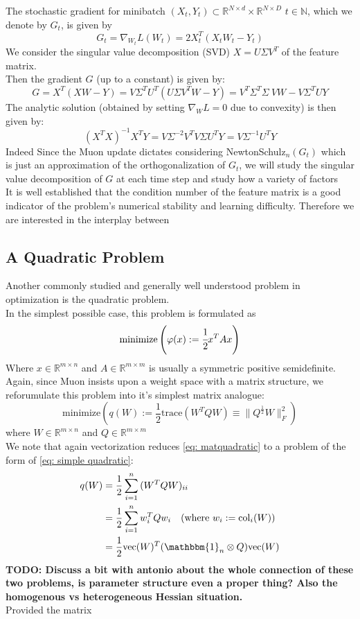 \documentclass[12pt]{book}
\newcommand{\N}{\mathbb{N}}
\newcommand{\R}{\mathbb{R}}
\newcommand{\todo}[1]{{\color{red}\bf{TODO: #1}}}
\begin{document}
The stochastic gradient for minibatch $(X_t, Y_t)\subset \R^{N\times d} \times \R^{N\times D}$ $t\in\N$, which we denote by $G_t$, is given by 
\[
	G_t = \nabla_{W_t} L(W_t) = 2X_t^{T} (X_tW_t - Y_t)
\]
We consider the singular value decomposition (SVD) $X = U \Sigma V^{T}$ of the feature matrix. 
\\
Then the gradient $G$ (up to a constant) is given by:
 \[
G = X^{T}(XW - Y) = V\Sigma ^{T} U^{T}(U\Sigma V^{T} W - Y) = V^{T}\Sigma^{T}\Sigma \ VW - V\Sigma^{T} U Y
\]
The analytic solution (obtained by setting $\nabla_W L = 0$ due to convexity) is then given by:
\[
	(X^{T}X)^{-1}X^{T}Y = V \Sigma^{-2}V^{T} V \Sigma U^{T}Y = V \Sigma ^{-1} U^{T}Y 
\] 
Indeed 
Since the Muon update dictates considering NewtonSchulz$_n(G_t)$ which is just an approximation of the orthogonalization of $G_t$, we will study the singular value decomposition of $G$ at each time step and study how a variety of factors 
\\
It is well established that the condition number of the feature matrix is a good indicator of the problem's numerical stability and learning difficulty. Therefore we are interested in the interplay between
\subsection{A Quadratic Problem}
Another commonly studied and generally well understood problem in optimization is the quadratic problem. \\
In the simplest possible case, this problem is formulated as 
\begin{equation}\label{eq: simple quadratic}
	\text{minimize} \left( \varphi(x) := \cfrac{1}{2} x^{T} A x\right) 
\end{equation}
Where $x \in \R^{m\times n}$ and $A\in \R^{m\times m}$ is usually a symmetric positive semidefinite.
\\
Again, since Muon insists upon a weight space with a matrix structure, we reforumulate this problem into it's simplest matrix analogue:
\begin{equation}\label{eq: matquadratic}
	\text{minimize}\left( q(W) := \frac{1}{2} \text{trace}(W^{T} Q W)  \equiv \|Q^{\frac{1}{2}} W\|_F^2\right)
\end{equation}
where $W\in\R^{m\times n}$ and $Q\in\R^{m\times m}$\\
We note that again vectorization reduces \eqref{eq: matquadratic} to a problem of the form of \eqref{eq: simple quadratic}:
\begin{align*}
q(W) &= \frac{1}{2} \sum_{i=1}^{n} {(W^{T} Q W)_{ii}} \\
     &= \frac{1}{2} \sum_{i=1}^{n} {w_i^{T} Q w_i}    \quad (\text{where } w_i := \text{col}_i(W))\\
 &= \frac{1}{2} \text{vec}(W)^{T} (\mathbbm{1}_n \otimes Q) \text{vec}(W) 
\end{align*}
\todo{Discuss a bit with antonio about the whole connection of these two problems, is parameter structure even a proper thing? Also the homogenous vs heterogeneous Hessian situation. }
\\
Provided the matrix 
\end{document}
